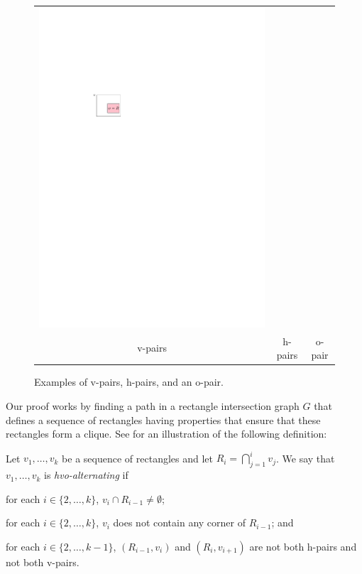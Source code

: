 \documentclass[lotsofwhite]{patmorin}
\begin{document}
\begin{figure}
\begin{tabular}{ccc}
   \includegraphics{figs/hvo-3} \\
   v-pairs & h-pairs & o-pair
   \end{tabular}
   \caption{Examples of v-pairs, h-pairs, and an o-pair.}
\end{figure}

Our proof works by finding a path in a rectangle intersection graph $G$
that defines a sequence of rectangles having properties that ensure
that these rectangles form a clique. See  for an
illustration of the following definition:

\begin{dfn}
Let $v_1,\ldots,v_k$ be a sequence of rectangles and let
$R_i=\bigcap_{j=1}^i v_j$.  We say that $v_1,\ldots,v_k$ is
\emph{hvo-alternating} if
\begin{compactenum}
  \item for each $i\in\{2,\ldots,k\}$, $v_i\cap R_{i-1}\neq \emptyset$;
  \item for each $i\in\{2,\ldots,k\}$,
        $v_i$ does not contain any corner of $R_{i-1}$; and
  \item for each $i\in\{2,\ldots,k-1\}$, $(R_{i-1},v_i)$ and
        $(R_i,v_{i+1})$ are not both h-pairs and not both v-pairs.
\end{compactenum}
\end{dfn}
\end{document}

